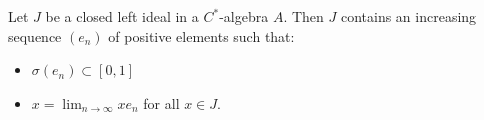 Let $J$ be a closed left ideal in a $C^*$-algebra $A$. Then $J$ contains an increasing sequence $(e_n)$ of positive elements such that:
\begin{itemize}
\item[(i)] $\sigma(e_n) \subset [0, 1]$
\item[(ii)] $x = \lim_{n \to \infty} x e_n$ for all $x \in J$.
\end{itemize}
